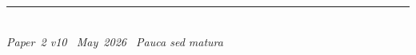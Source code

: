 \documentclass[11pt]{article}
\begin{document}
\enlargethispage{3\baselineskip}
\vspace*{\fill}
\begin{minipage}{\linewidth}
\rule{\linewidth}{0.4pt}\smallskip\\
\small\emph{Paper~2 v10 \textperiodcentered\ May~2026
\textperiodcentered\ Pauca sed matura}
\end{minipage}
\end{document}
